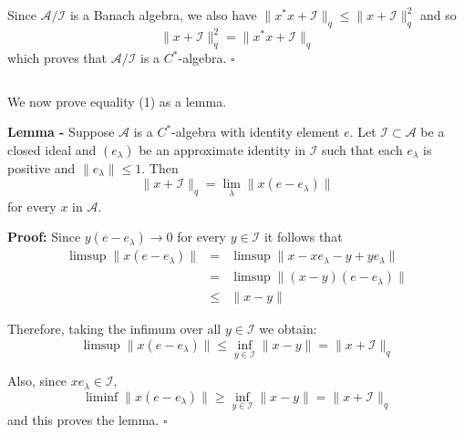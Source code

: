 \documentclass[12pt]{article}
\begin{document}
Since $\mathcal{A}/\mathcal{I}$ is a Banach algebra, we also have $\|x^*x+\mathcal{I}\|_q\leq \|x+\mathcal{I}\|_q^2$ and so
\begin{displaymath}
\|x+\mathcal{I}\|_q^2=\|x^*x+\mathcal{I}\|_q
\end{displaymath}
which proves that $\mathcal{A}/\mathcal{I}$ is a $C^*$-algebra. $\square$

$\;$

We now prove equality (1) as a lemma.

{\bf Lemma -} Suppose $\mathcal{A}$ is a $C^*$-algebra with identity element $e$. Let $\mathcal{I} \subset \mathcal{A}$ be a closed ideal and $(e_{\lambda})$ be an approximate identity in $\mathcal{I}$ such that each $e_{\lambda}$ is positive and $\|e_{\lambda}\|\leq 1$. Then
\begin{displaymath}
\|x + \mathcal{I}\|_q = \lim_{\lambda}\|x(e-e_{\lambda})\|
\end{displaymath}
for every $x$ in $\mathcal{A}$.

{\bf Proof:} Since $y(e-e_{\lambda})\longrightarrow 0$ for every $y \in \mathcal{I}$ it follows that
\begin{eqnarray*}
\limsup \|x(e-e_{\lambda})\|& = & \limsup\|x-xe_{\lambda}-y+ye_{\lambda}\|\\
& = & \limsup\|(x-y)(e-e_{\lambda})\|\\
& \leq & \|x-y\|
\end{eqnarray*}

Therefore, taking the infimum over all $y \in \mathcal{I}$ we obtain:
\begin{displaymath}
\limsup \|x(e-e_{\lambda})\| \leq \inf_{y \in \mathcal{I}} \|x-y\| = \|x+\mathcal{I}\|_q
\end{displaymath}

Also, since $xe_{\lambda} \in \mathcal{I}$,
\begin{displaymath}
\liminf\|x(e-e_{\lambda})\|\geq \inf_{y \in \mathcal{I}} \|x-y\| = \|x+\mathcal{I}\|_q
\end{displaymath}
and this proves the lemma. $\square$
\end{document}
